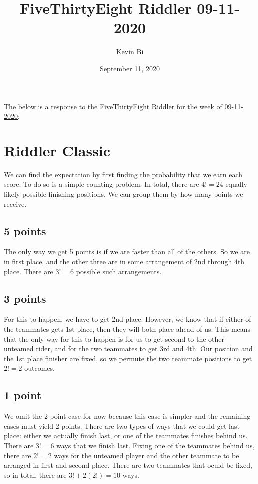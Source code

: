 \documentclass{article}
\title{FiveThirtyEight Riddler 09-11-2020}
\author{Kevin Bi}
\date{September 11, 2020}
\begin{document}
\maketitle
The below is a response to the FiveThirtyEight Riddler for the \href{https://fivethirtyeight.com/features/can-you-reach-the-summit-first/}{week of 09-11-2020}:

\section*{Riddler Classic}
We can find the expectation by first finding the probability that we earn each score. To do so is a simple counting problem. In total, there are $4! = 24$ equally likely possible finishing positions. We can group them by how many points we receive. 

\subsection*{5 points}
The only way we get 5 points is if we are faster than all of the others. So we are in first place, and the other three are in some arrangement of 2nd through 4th place. There are $3! = 6$ possible such arrangements.

\subsection*{3 points}
For this to happen, we have to get 2nd place. However, we know that if either of the teammates gets 1st place, then they will both place ahead of us. This means that the only way for this to happen is for us to get second to the other unteamed rider, and for the two teammates to get 3rd and 4th. Our position and the 1st place finisher are fixed, so we permute the two teammate positions to get $2! = 2$ outcomes.

\subsection*{1 point}
We omit the 2 point case for now because this case is simpler and the remaining cases must yield 2 points. There are two types of ways that we could get last place: either we actually finish last, or one of the teammates finishes behind us. There are $3! = 6$ ways that we finish last. Fixing one of the teammates behind us, there are $2! = 2$ ways for the unteamed player and the other teammate to be arranged in first and second place. There are two teammates that oculd be fixed, so in total, there are $3! + 2 (2!) = 10$ ways.
\end{document}
